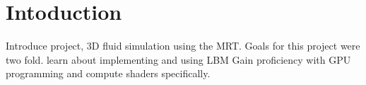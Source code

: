 \section{Intoduction}

\begin{outline}
\1 Introduce project, 3D fluid simulation using the MRT.
\1 Goals for this project were two fold.
\2 learn about implementing and using LBM
\2 Gain proficiency with GPU programming and compute shaders specifically.
\end{outline}
